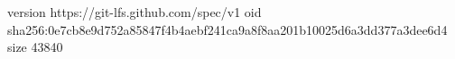 version https://git-lfs.github.com/spec/v1
oid sha256:0e7cb8e9d752a85847f4b4aebf241ca9a8f8aa201b10025d6a3dd377a3dee6d4
size 43840
